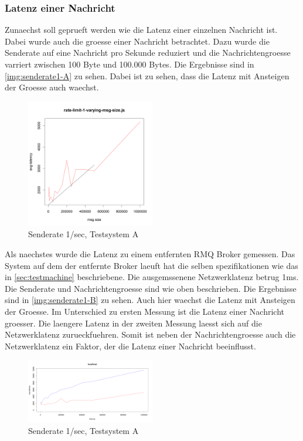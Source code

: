 \subsubsection{Latenz einer Nachricht}
\label{sec:oneMsgLatency}
Zunaechst soll geprueft werden wie die Latenz einer einzelnen Nachricht ist. Dabei wurde auch die groesse einer Nachricht betrachtet. Dazu wurde die Senderate auf eine Nachricht pro Sekunde reduziert und die Nachrichtengroesse varriert zwischen 100 Byte und 100.000 Bytes.
Die Ergebnisse sind in \autoref{img:senderate1-A} zu sehen. Dabei ist zu sehen, dass die Latenz mit Ansteigen der Groesse auch waechst. 
\begin{figure}
\center
  \includegraphics[width=0.5\textwidth]{images/measurement/rate-limit-1-A.png}
  \caption{Senderate 1/sec, Testsystem A}
  \label{img:senderate1-A}
\end{figure}
Als naechstes wurde die Latenz zu einem entfernten RMQ Broker gemessen. Das System auf dem der entfernte Broker laeuft hat die selben spezifikationen wie das in \autoref{sec:testmachine} beschriebene. Die ausgemssenene Netzwerklatenz betrug 1ms. Die Senderate und Nachrichtengroesse sind wie oben beschrieben. Die Ergebnisse sind in \autoref{img:senderate1-B} zu sehen. Auch hier waechst die Latenz mit Ansteigen der Groesse. Im Unterschied zu ersten Messung ist die Latenz einer Nachricht groesser. 
Die laengere Latenz in der zweiten Messung laesst sich auf die Netzwerklatenz zurueckfuehren. Somit ist neben der Nachrichtengroesse auch die Netzwerklatenz ein Faktor, der die Latenz einer Nachricht beeinflusst.

\begin{figure}
\center
  \includegraphics[width=0.5\textwidth]{images/measurement/rate-limit-1-AvsB.png}
  \caption{Senderate 1/sec, Testsystem A}
  \label{img:senderate1-B}
\end{figure}

